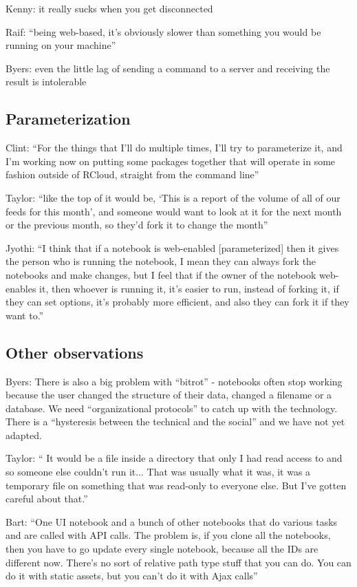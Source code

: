 Kenny: it really sucks when you get disconnected

Raif: ``being web-based, it's obviously slower than something you would be running on your machine''

Byers: even the little lag of sending a command to a server and receiving the result is intolerable


\subsection{Parameterization}
Clint: ``For the things that I'll do multiple times, I'll try to parameterize it, and I'm working now on putting some packages together that will operate in some fashion outside of RCloud, straight from the command line''

Taylor: ``like the top of it would be, `This is a report of the volume of all of our feeds for this month', and someone would want to look at it for the next month or the previous month, so they'd fork it to change the month''

Jyothi: ``I think that if a notebook is web-enabled [parameterized] then it gives the person who is running the notebook, I mean they can always fork the notebooks and make changes, but I feel that if the owner of the notebook web-enables it, then whoever is running it, it's easier to run, instead of forking it, if they can set options, it's probably more efficient, and also they can fork it if they want to.''


\subsection{Other observations}
Byers: There is also a big problem with ``bitrot'' - notebooks often stop working because the user changed the structure of their data, changed a filename or a database.  We need ``organizational protocols'' to catch up with the technology.  There is a ``hysteresis between the technical and the social'' and we have not yet adapted.

Taylor: `` It would be a file inside a directory that only I had read access to and so someone else couldn't run it... That was usually what it was, it was a temporary file on something that was read-only to everyone else. But I've gotten careful about that.''

Bart: ``One UI notebook and a bunch of other notebooks that do various tasks and are called with API calls. The problem is, if you clone all the notebooks, then you have to go update every single notebook, because all the IDs are different now. There's no sort of relative path type stuff that you can do. You can do it with static assets, but you can't do it with Ajax calls''
